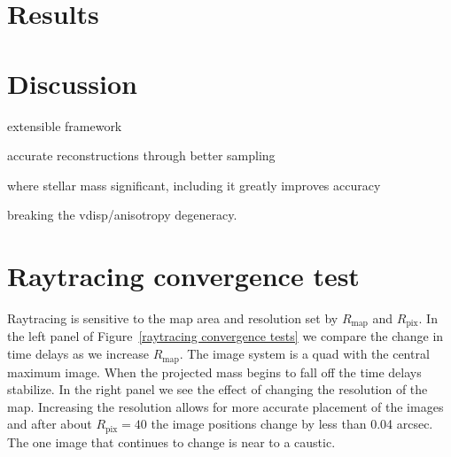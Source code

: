 \documentclass[onecolumn,galley]{mn2e}
\newcommand{\Rmap}{\ensuremath{R_\mathrm{map}}}
\newcommand{\Rpix}{\ensuremath{R_\mathrm{pix}}}
\newcommand{\figref}[1] {Figure~\ref{#1}}
\begin{document}


\section{Results} %



\section{Discussion}

extensible framework                                                       

accurate reconstructions through better sampling                           

where stellar mass significant, including it greatly improves accuracy 

breaking the vdisp/anisotropy degeneracy.

\appendix

\section{Raytracing convergence test}
Raytracing is sensitive to the map area and resolution set by $\Rmap$ and
$\Rpix$.  In the left panel of \figref{raytracing convergence tests} we compare
the change in time delays as we increase $\Rmap$.  The image system is a quad
with the central maximum image. When the projected mass begins to fall off the
time delays stabilize. In the right panel we see the effect of changing the
resolution of the map.  Increasing the resolution allows for more accurate
placement of the images and after about $\Rpix=40$ the image positions change
by less than 0.04 arcsec. The one image that continues to change is near to a
caustic.  
\end{document}
